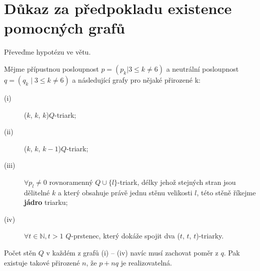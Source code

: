 

\section{Důkaz za předpokladu existence pomocných grafů}
Převeďme hypotézu ve větu.

\begin{veta}\label{veta02:2}
Mějme přípustnou posloupnost $p=(p_k | 3 \leq k \neq 6)$ a neutrální posloupnost $q=(q_k \mid 3 \leq k \neq 6)$ a následující grafy pro nějaké přirozené k:
\begin{description}
\item[(i)] ($k$, $k$, $k$)$Q$-triark;
\item[(ii)] ($k$, $k$, $k-1$)$Q$-triark;
\item[(iii)] $\forall p_l \neq 0$ rovnoramenný $Q\cup \lbrace l \rbrace$-triark, délky jehož stejných stran jsou dělitelné $k$ a který obsahuje právě jednu stěnu velikosti $l$, této stěně říkejme \textbf{jádro} triarku;
\item[(iv)] $\forall t \in \mathbb{N}, t>1$ $Q$-prstenec, který dokáže spojit dva ($t$, $t$, $t$)-triarky.
\end{description} 

Počet stěn $Q$ v každém z grafů (i) -- (iv) navíc musí zachovat poměr z $q$. Pak existuje takové přirozené $n$, že $p+nq$ je realizovatelná.
\end{veta}


